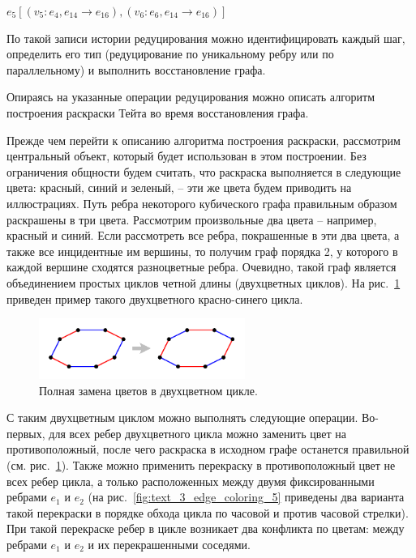 $e_5 [(v_5 : e_4, e_{14} \rightarrow e_{16}), (v_6 : e_6, e_{14} \rightarrow e_{16})]$

По такой записи истории редуцирования можно идентифицировать каждый шаг, определить его тип (редуцирование по уникальному ребру или по параллельному) и выполнить восстановление графа.

Опираясь на указанные операции редуцирования можно описать алгоритм построения раскраски Тейта во время восстановления графа.

Прежде чем перейти к описанию алгоритма построения раскраски, рассмотрим центральный объект, который будет использован в этом построении.
Без ограничения общности будем считать, что раскраска выполняется в следующие цвета: красный, синий и зеленый, -- эти же цвета будем приводить на иллюстрациях.
Путь ребра некоторого кубического графа правильным образом раскрашены в три цвета.
Рассмотрим произвольные два цвета -- например, красный и синий.
Если рассмотреть все ребра, покрашенные в эти два цвета, а также все инцидентные им вершины, то получим граф порядка 2, у которого в каждой вершине сходятся разноцветные ребра.
Очевидно, такой граф является объединением простых циклов четной длины (двухцветных циклов).
На рис.~\ref{fig:text_3_edge_coloring_4} приведен пример такого двухцветного красно-синего цикла.

\begin{figure}[ht]
\centering
\includegraphics[width=0.6\textwidth]{fig/par_edge_col_4-bicolor-cycle.pdf}
\singlespacing
{}\caption{Полная замена цветов в двухцветном цикле.}
\label{fig:text_3_edge_coloring_4}
\end{figure}

С таким двухцветным циклом можно выполнять следующие операции.
Во-первых, для всех ребер двухцветного цикла можно заменить цвет на противоположный, после чего раскраска в исходном графе останется правильной (см. рис.~\ref{fig:text_3_edge_coloring_4}).
Также можно применить перекраску в противоположный цвет не всех ребер цикла, а только расположенных между двумя фиксированными ребрами $e_1$ и $e_2$ (на рис.~\ref{fig:text_3_edge_coloring_5} приведены два варианта такой перекраски в порядке обхода цикла по часовой и против часовой стрелки).
При такой перекраске ребер в цикле возникает два конфликта по цветам: между ребрами $e_1$ и $e_2$ и их перекрашенными соседями.

